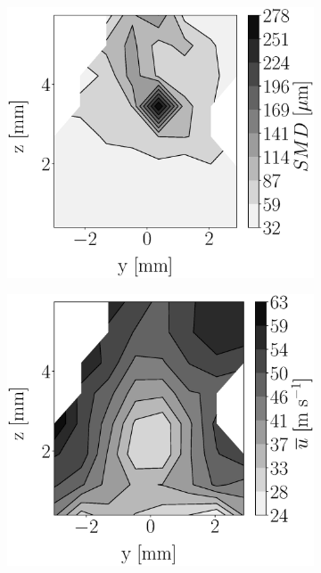 \begin{figure}[h!]
\flushleft
\begin{subfigure}[b]{0.22\textwidth}
	\centering
   \includegraphics[scale=0.17]{./part2_developments/figures_ch5_resolved_JICF/injectors_SLI/uG75_dx10_x05_SMD_map.eps}
\end{subfigure}
   \hspace{0.17in}
\begin{subfigure}[b]{0.22\textwidth}
	\centering
   \includegraphics[scale=0.17]{./part2_developments/figures_ch5_resolved_JICF/injectors_SLI/uG75_dx10_x05_ux_mean_map.eps}

\end{subfigure}
\end{figure}

